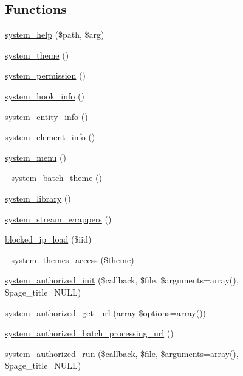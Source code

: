 \subsection*{Functions}
\begin{DoxyCompactItemize}
\item 
\hyperlink{system_8module_af0ca5e04a8b6cc3bba72b778f2e8c81d}{system\_\-help} (\$path, \$arg)
\item 
\hyperlink{system_8module_a44b4dbe61c9f2fb668b8b2003dd00090}{system\_\-theme} ()
\item 
\hyperlink{system_8module_a21ecb659e6aa944c6c85ad0b50dcbb0e}{system\_\-permission} ()
\item 
\hyperlink{system_8module_a9df96726c754189e19b7f065bcb5c833}{system\_\-hook\_\-info} ()
\item 
\hyperlink{system_8module_ad12d07929306617e476e0ddc18d1129f}{system\_\-entity\_\-info} ()
\item 
\hyperlink{system_8module_a39faa9a5430a70bb37a3c8af72460a14}{system\_\-element\_\-info} ()
\item 
\hyperlink{system_8module_ae25cda0ea4fd63936e8f955dd9cfc269}{system\_\-menu} ()
\item 
\hyperlink{system_8module_a2d3a1205255a83b5f5c3c720a758f837}{\_\-system\_\-batch\_\-theme} ()
\item 
\hyperlink{system_8module_a7f680fce0aaf48a96f122edf5345097f}{system\_\-library} ()
\item 
\hyperlink{system_8module_a67821dedc3699910bb2168a40c5d7278}{system\_\-stream\_\-wrappers} ()
\item 
\hyperlink{system_8module_a8cd6bf9052269e332d0a8863ad6f1608}{blocked\_\-ip\_\-load} (\$iid)
\item 
\hyperlink{system_8module_a0428d3295fa8b31adf63c3d25c70d349}{\_\-system\_\-themes\_\-access} (\$theme)
\item 
\hyperlink{group__authorize_ga17756b29805705dbea25798d6004d5dd}{system\_\-authorized\_\-init} (\$callback, \$file, \$arguments=array(), \$page\_\-title=NULL)
\item 
\hyperlink{group__authorize_gab59393fbd369097724650dec4be9c1dd}{system\_\-authorized\_\-get\_\-url} (array \$options=array())
\item 
\hyperlink{group__authorize_gae4eeb93b25a44e4280535f21ed0a0c78}{system\_\-authorized\_\-batch\_\-processing\_\-url} ()
\item 
\hyperlink{group__authorize_gae12fb581acdf9ef042c9137fc6de4d4c}{system\_\-authorized\_\-run} (\$callback, \$file, \$arguments=array(), \$page\_\-title=NULL)

\end{DoxyCompactItemize}
